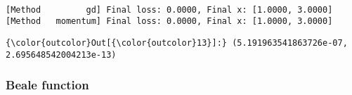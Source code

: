 \documentclass[11pt]{article}
\begin{document}
    \begin{center}
    \end{center}
    { \hspace*{\fill} \\}
    
    \begin{center}
    \end{center}
    { \hspace*{\fill} \\}
    
    \begin{center}
    \end{center}
    { \hspace*{\fill} \\}
    
    \begin{Verbatim}[commandchars=\\\{\}]
[Method         gd] Final loss: 0.0000, Final x: [1.0000, 3.0000]
[Method   momentum] Final loss: 0.0000, Final x: [1.0000, 3.0000]

    \end{Verbatim}

\begin{Verbatim}[commandchars=\\\{\}]
{\color{outcolor}Out[{\color{outcolor}13}]:} (5.191963541863726e-07, 2.695648542004213e-13)
\end{Verbatim}
            
    \subsubsection{Beale function}\label{beale-function}
\end{document}

